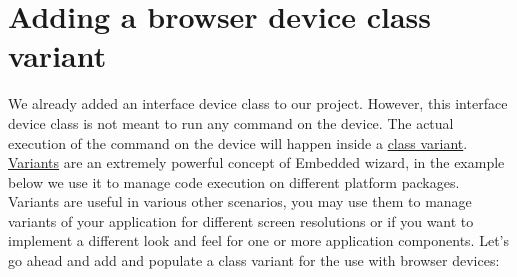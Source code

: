 \documentclass[
  a4paper,
,tablecaptionabove
]{scrbook}
\begin{document}
\hypertarget{_adding_a_browser_device_class_variant}{%
\section{Adding a browser device class
variant}\label{_adding_a_browser_device_class_variant}}

We already added an interface device class to our project. However, this
interface device class is not meant to run any command on the device.
The actual execution of the command on the device will happen inside a
\href{https://doc.embedded-wizard.de/class-variant-member}{class
variant}.
\href{https://doc.embedded-wizard.de/managing-project-variants}{Variants}
are an extremely powerful concept of Embedded wizard, in the example
below we use it to manage code execution on different platform packages.
Variants are useful in various other scenarios, you may use them to
manage variants of your application for different screen resolutions or
if you want to implement a different look and feel for one or more
application components. Let's go ahead and add and populate a class
variant for the use with browser devices:
\end{document}
